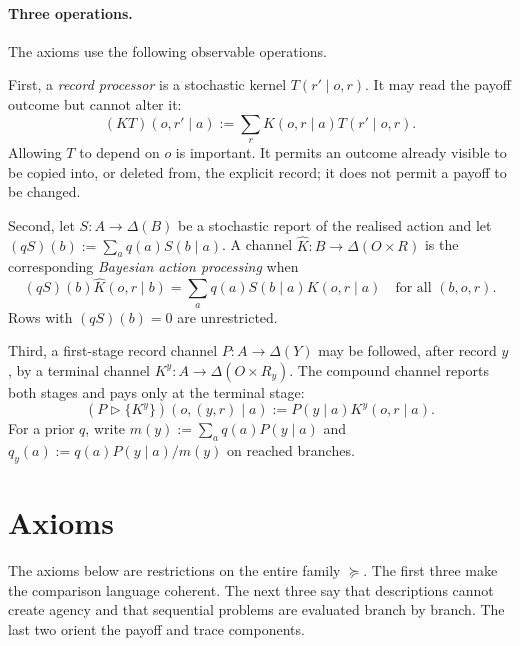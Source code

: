\documentclass[11pt,a4paper]{article}
\theoremstyle{definition}
\newcommand{\D}{\Delta}
\newcommand{\1}{\mathbf 1}
\begin{document}
\paragraph{Three operations.}
The axioms use the following observable operations.

First, a \emph{record processor} is a stochastic kernel $T(r'\mid o,r)$.  It may read the payoff outcome but cannot
alter it:
\begin{equation}
 (KT)(o,r'\mid a):=\sum_r K(o,r\mid a)T(r'\mid o,r).
 \label{eq:record-processing}
\end{equation}
Allowing $T$ to depend on $o$ is important.  It permits an outcome already visible to be copied into, or deleted from,
the explicit record; it does not permit a payoff to be changed.

Second, let $S:A\to\D(B)$ be a stochastic report of the realised action and let $(qS)(b):=\sum_aq(a)S(b\mid a)$.
A channel $\widehat K:B\to\D(O\times R)$ is the corresponding \emph{Bayesian action processing} when
\begin{equation}
 (qS)(b)\widehat K(o,r\mid b)
 =\sum_a q(a)S(b\mid a)K(o,r\mid a)
 \quad\text{for all }(b,o,r).
 \label{eq:action-processing}
\end{equation}
Rows with $(qS)(b)=0$ are unrestricted.

Third, a first-stage record channel $P:A\to\D(Y)$ may be followed, after record $y$, by a terminal channel
$K^y:A\to\D(O\times R_y)$.  The compound channel reports both stages and pays only at the terminal stage:
\begin{equation}
 (P\triangleright\{K^y\})(o,(y,r)\mid a)
 :=P(y\mid a)K^y(o,r\mid a).
 \label{eq:compound}
\end{equation}
For a prior $q$, write $m(y):=\sum_aq(a)P(y\mid a)$ and
$q_y(a):=q(a)P(y\mid a)/m(y)$ on reached branches.

\section{Axioms}

The axioms below are restrictions on the entire family $\boldsymbol{\succeq}$.  The first three make the comparison
language coherent.  The next three say that descriptions cannot create
agency and that sequential problems are evaluated branch by branch.  The last two orient the payoff and trace
components.
\end{document}
